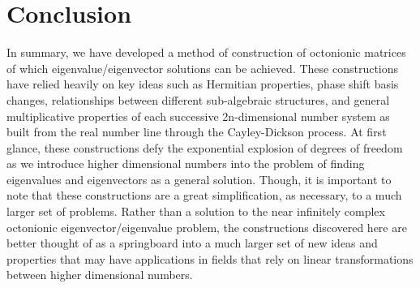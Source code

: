 \documentclass{article}
\theoremstyle{plain}
\begin{document}
\section{Conclusion}
In summary, we have developed a method of construction of octonionic matrices of which eigenvalue/eigenvector solutions can be achieved. These constructions have relied heavily on key ideas such as Hermitian properties, phase shift basis changes, relationships between different sub-algebraic structures, and general multiplicative properties of each successive 2n-dimensional number system as built from the real number line through the Cayley-Dickson process. At first glance, these constructions defy the exponential explosion of degrees of freedom as we introduce higher dimensional numbers into the problem of finding eigenvalues and eigenvectors as a general solution. Though, it is important to note that these constructions are a great simplification, as necessary, to a much larger set of problems. Rather than a solution to the near infinitely complex octonionic eigenvector/eigenvalue problem, the constructions discovered here are better thought of as a springboard into a much larger set of new ideas and properties that may have applications in fields that rely on linear transformations between higher dimensional numbers.
\end{document}
